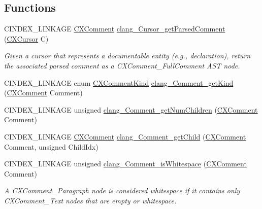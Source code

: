 \subsection*{Functions}
\begin{DoxyCompactItemize}
\item 
\mbox{\label{group__CINDEX__COMMENT_gab4f95ae3b2e0bd63b10cecc3727a391e}} 
C\+I\+N\+D\+E\+X\+\_\+\+L\+I\+N\+K\+A\+GE \mbox{\hyperlink{structCXComment}{C\+X\+Comment}} \mbox{\hyperlink{group__CINDEX__COMMENT_gab4f95ae3b2e0bd63b10cecc3727a391e}{clang\+\_\+\+Cursor\+\_\+get\+Parsed\+Comment}} (\mbox{\hyperlink{structCXCursor}{C\+X\+Cursor}} C)
\begin{DoxyCompactList}\small\item\em Given a cursor that represents a documentable entity (e.\+g., declaration), return the associated parsed comment as a {\ttfamily C\+X\+Comment\+\_\+\+Full\+Comment} A\+ST node. \end{DoxyCompactList}\item 
C\+I\+N\+D\+E\+X\+\_\+\+L\+I\+N\+K\+A\+GE enum \mbox{\hyperlink{group__CINDEX__COMMENT_ga3c336d80551401fde394b84aa5651221}{C\+X\+Comment\+Kind}} \mbox{\hyperlink{group__CINDEX__COMMENT_gad7f2a27ab2f69abcb9442e05a21a130f}{clang\+\_\+\+Comment\+\_\+get\+Kind}} (\mbox{\hyperlink{structCXComment}{C\+X\+Comment}} Comment)
\item 
C\+I\+N\+D\+E\+X\+\_\+\+L\+I\+N\+K\+A\+GE unsigned \mbox{\hyperlink{group__CINDEX__COMMENT_gaad4eba69493735a4db462bb4b5bed97a}{clang\+\_\+\+Comment\+\_\+get\+Num\+Children}} (\mbox{\hyperlink{structCXComment}{C\+X\+Comment}} Comment)
\item 
C\+I\+N\+D\+E\+X\+\_\+\+L\+I\+N\+K\+A\+GE \mbox{\hyperlink{structCXComment}{C\+X\+Comment}} \mbox{\hyperlink{group__CINDEX__COMMENT_gad5567ecc26b083562e42b83170c105aa}{clang\+\_\+\+Comment\+\_\+get\+Child}} (\mbox{\hyperlink{structCXComment}{C\+X\+Comment}} Comment, unsigned Child\+Idx)
\item 
C\+I\+N\+D\+E\+X\+\_\+\+L\+I\+N\+K\+A\+GE unsigned \mbox{\hyperlink{group__CINDEX__COMMENT_ga1193c1dc798aecad92cb30cea78bf71e}{clang\+\_\+\+Comment\+\_\+is\+Whitespace}} (\mbox{\hyperlink{structCXComment}{C\+X\+Comment}} Comment)
\begin{DoxyCompactList}\small\item\em A {\ttfamily C\+X\+Comment\+\_\+\+Paragraph} node is considered whitespace if it contains only {\ttfamily C\+X\+Comment\+\_\+\+Text} nodes that are empty or whitespace. \end{DoxyCompactList}\item 

\end{DoxyCompactItemize}
